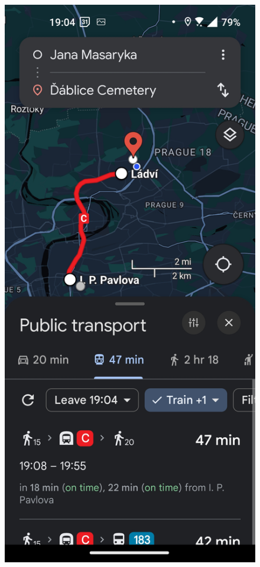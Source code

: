 \begin{figure}[h!]
    \begin{minipage}[b]{0.45\textwidth}
        \centering
        \includegraphics[width=\textwidth]{img/screenshots/google_maps_result_1.jpg}

\end{minipage}
\end{figure}
